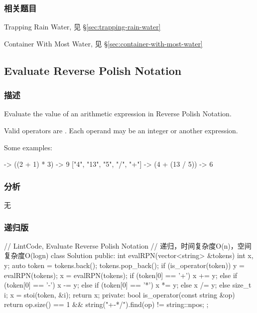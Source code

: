 \subsubsection{相关题目}
\begindot
\item Trapping Rain Water, 见 \S \ref{sec:trapping-rain-water}
\item Container With Most Water, 见 \S \ref{sec:container-with-most-water}
\myenddot


\subsection{Evaluate Reverse Polish Notation} %
\label{sec:Evaluate-Reverse-Polish-Notation}


\subsubsection{描述}
Evaluate the value of an arithmetic expression in Reverse Polish Notation.

Valid operators are \fn{+, -, *, /}. Each operand may be an integer or another expression.

Some examples:
\begin{Code}
  ["2", "1", "+", "3", "*"] -> ((2 + 1) * 3) -> 9
  ["4", "13", "5", "/", "+"] -> (4 + (13 / 5)) -> 6
\end{Code}


\subsubsection{分析}
无


\subsubsection{递归版}
\begin{Code}
// LintCode, Evaluate Reverse Polish Notation
// 递归，时间复杂度O(n)，空间复杂度O(logn)
class Solution {
public:
    int evalRPN(vector<string> &tokens) {
        int x, y;
        auto token = tokens.back();  tokens.pop_back();
        if (is_operator(token))  {
            y = evalRPN(tokens);
            x = evalRPN(tokens);
            if (token[0] == '+')       x += y;
            else if (token[0] == '-')  x -= y;
            else if (token[0] == '*')  x *= y;
            else                       x /= y;
        } else  {
            size_t i;
            x = stoi(token, &i);
        }
        return x;
    }
private:
    bool is_operator(const string &op) {
        return op.size() == 1 && string("+-*/").find(op) != string::npos;
    }
};
\end{Code}


